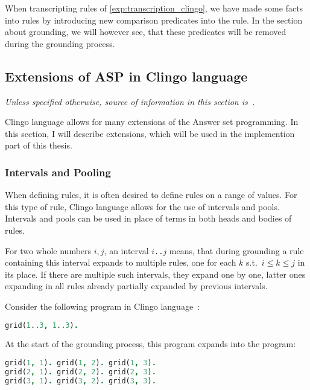 When transcripting rules of \cref{exp:transcription_clingo},
we have made some facts into rules by introducing new comparison predicates into the rule.
In the section about grounding, we will however see, that these predicates will be
removed during the grounding process.

\subsection{Extensions of ASP in Clingo language}

\textit{%
    Unless specified otherwise,
    source of information in this section is~\cite{gebser2019potassco}.}
    \vspace{1em}

Clingo language allows for many extensions of the Answer set programming.
In this section, I will describe extensions, which will be used in the implemention part
of this thesis.


\subsubsection{Intervals and Pooling}

When defining rules, it is often desired to define rules on a range of values.
For this type of rule, Clingo language allows for the use of intervals and pools.
Intervals and pools can be used in place of terms in both heads and bodies of rules.

For two whole numbers $i, j$, an interval \texttt{$i$..$j$} means,
that during grounding a rule containing this interval expands to multiple rules,
one for each $k$ s.t.\ $i \leq k\leq j$ in its place.
If there are multiple such intervals, they expand one by one,
latter ones expanding in all rules already partially expanded by previous intervals.

\begin{example}
    Consider the following program in Clingo language~\cite{gebser2019potassco}:
    \begin{lstlisting}[language=prolog, numbers=none]
grid(1..3, 1..3).
\end{lstlisting}
    At the start of the grounding process, this program expands into the program:
    \begin{lstlisting}[language=prolog, numbers=none]
grid(1, 1). grid(1, 2). grid(1, 3).
grid(2, 1). grid(2, 2). grid(2, 3).
grid(3, 1). grid(3, 2). grid(3, 3).
\end{lstlisting}
\end{example}

